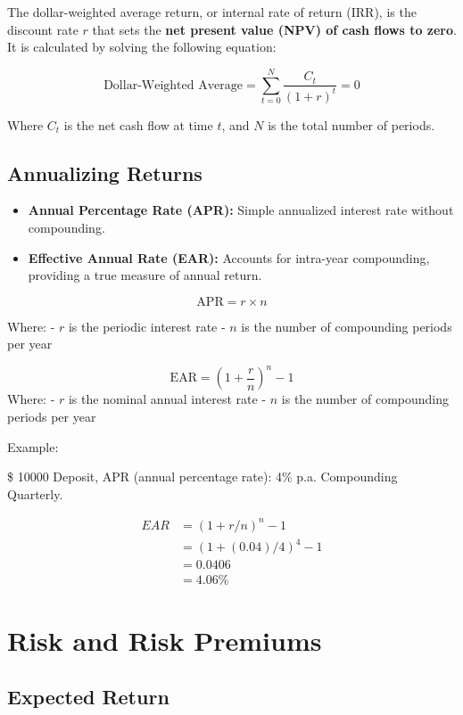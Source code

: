 \documentclass[
]{book}
\providecommand{\tightlist}{%
  \setlength{\itemsep}{0pt}\setlength{\parskip}{0pt}}
\begin{document}
The dollar-weighted average return, or internal rate of return (IRR), is the discount rate \(r\) that sets the \textbf{net present value (NPV) of cash flows to zero}. It is calculated by solving the following equation:

\[ \text{Dollar-Weighted Average} = \sum_{t=0}^{N} \frac{C_t}{(1 + r)^t} = 0 \]

Where \(C_t\) is the net cash flow at time \(t\), and \(N\) is the total number of periods.

\hypertarget{annualizing-returns}{%
\subsection{Annualizing Returns}\label{annualizing-returns}}

\begin{itemize}
\tightlist
\item
  \textbf{Annual Percentage Rate (APR):} Simple annualized interest rate without compounding.
\item
  \textbf{Effective Annual Rate (EAR):} Accounts for intra-year compounding, providing a true measure of annual return.
\end{itemize}

\[
\text{APR} = r \times n
\]

Where:
- \(r\) is the periodic interest rate
- \(n\) is the number of compounding periods per year

\[
\text{EAR} = \left(1 + \frac{r}{n}\right)^n - 1
\]
Where:
- \(r\) is the nominal annual interest rate
- \(n\) is the number of compounding periods per year

Example:

\$ 10000 Deposit, APR (annual percentage rate): 4\% p.a. Compounding Quarterly.

\[ 
\begin{aligned}
EAR &= (1+r/n)^n− 1 \\
&=(1+(0.04)/4)^4 −1 \\
&=0.0406 \\
&= 4.06\% 
\end{aligned}
\]

\hypertarget{risk-and-risk-premiums}{%
\section{Risk and Risk Premiums}\label{risk-and-risk-premiums}}

\hypertarget{expected-return}{%
\subsection{Expected Return}\label{expected-return}}
\end{document}
